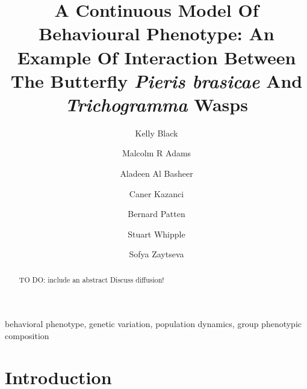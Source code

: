 \documentclass[review]{elsarticle}
\begin{document}
\begin{frontmatter}

\title{A Continuous Model Of Behavioural Phenotype: An Example Of
  Interaction Between The Butterfly \textit{Pieris brasicae} And
  \textit{Trichogramma} Wasps}

\author[math]{Kelly Black}\author[math]{Malcolm R Adams}\author[math]{Aladeen Al Basheer}\author[math,engineering]{Caner Kazanci}\author[odum]{Bernard Patten}\author[odum]{Stuart Whipple}\author[math]{Sofya Zaytseva}

\address[math]{Department of Mathematics, University of Georgia, Athens, GA 30602, USA}
\address[engineering]{College of Engineering, University of Georgia, Athens, GA 30602, USA}
\address[odum]{Odum School of Ecology and College of Engineering, University of Georgia, Athens, GA 30602, USA}



\begin{abstract}
TO DO: include an abstract
Discuss diffusion!
\end{abstract}

\begin{keyword}
behavioral phenotype, genetic variation, population dynamics, group phenotypic composition
\end{keyword}

\end{frontmatter}

\linenumbers


\section{Introduction}
\end{document}
